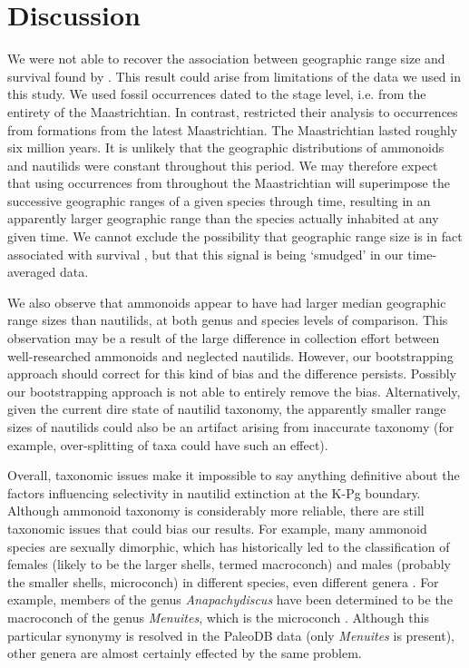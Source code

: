 \documentclass[a4paper]{article}
\begin{document}
\section*{Discussion}

We were not able to recover the association between geographic range size and survival found by \textcite{landmanAmmoniteExtinctionNautilid2014}. This result could arise from limitations of the data we used in this study. We used fossil occurrences dated to the stage level, i.e. from the entirety of the Maastrichtian. In contrast, \textcite{landmanAmmoniteExtinctionNautilid2014} restricted their analysis to occurrences from formations from the latest Maastrichtian. 
The Maastrichtian lasted roughly six million years.
It is unlikely that the geographic distributions of ammonoids and nautilids were constant throughout this period. We may therefore expect that using occurrences from throughout the Maastrichtian will superimpose the successive geographic ranges of a given species through time, resulting in an apparently larger geographic range than the species actually inhabited at any given time. We cannot exclude the possibility that geographic range size is in fact associated with survival \parencite{landmanAmmoniteExtinctionNautilid2014}, but that this signal is being `smudged' in our time-averaged data.


We also observe that ammonoids appear to have had larger median geographic range sizes than nautilids, at both genus and species levels of comparison. This observation may be a result of the large difference in collection effort between well-researched ammonoids and neglected nautilids. However, our bootstrapping approach should correct for this kind of bias
and the difference persists. Possibly our bootstrapping approach is not able to entirely remove the bias. Alternatively, given the current dire state of nautilid taxonomy,
the apparently smaller range sizes of nautilids could also be an artifact arising from inaccurate taxonomy (for example, over-splitting of taxa could have such an effect).

Overall, taxonomic issues make it impossible to say anything definitive about the factors influencing selectivity in nautilid extinction at the K-Pg boundary. 
Although ammonoid taxonomy is considerably more reliable, there are still taxonomic issues that could bias our results. 
For example, many ammonoid species are sexually dimorphic, which has historically led to the classification of females (likely to be the larger shells, termed macroconch) and males (probably the smaller shells, microconch) in different species, even different genera \parencite{cobbanUpperCretaceousDimorphic1993}. For example, members of the genus \textit{Anapachydiscus} have been determined to be the macroconch of the genus \textit{Menuites}, which is the microconch \parencite{cobbanUpperCretaceousDimorphic1993}. Although this particular synonymy is resolved in the PaleoDB data (only \textit{Menuites} is present), other genera are almost certainly effected by the same problem. 
\end{document}

